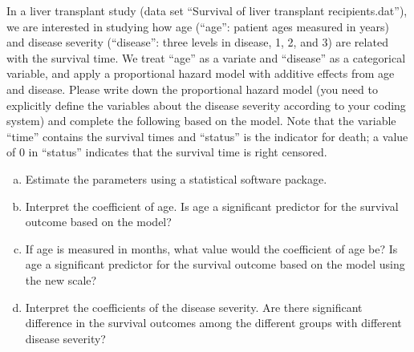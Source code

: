 \documentclass[12pt]{elegantbook}
\begin{document}
    \begin{exercise*}[2]
        In a liver transplant study (data set “Survival of liver transplant recipients.dat”), we are interested in studying how age (“age”: patient ages measured in years) and disease severity (“disease”: three levels in disease, 1, 2, and 3) are related with the survival time. We treat “age” as a variate and “disease” as a categorical variable, and apply a proportional hazard model with additive effects from age and disease. Please write down the proportional hazard model (you need to explicitly define the variables about the disease severity according to your coding system) and complete the following based on the model. Note that the variable “time” contains the survival times and “status” is the indicator for death; a value of 0 in “status” indicates that the survival time is right censored. 
        \begin{enumerate}[(a)]
            \item Estimate the parameters using a statistical software package.
            \item Interpret the coefficient of age. Is age a significant predictor for the survival outcome based on the model?
            \item If age is measured in months, what value would the coefficient of age be? Is age a significant predictor for the survival outcome based on the model using the new scale?
            \item Interpret the coefficients of the disease severity. Are there significant difference in the survival outcomes among the different groups with different disease severity?
        \end{enumerate}
    \end{exercise*}
\end{document}
